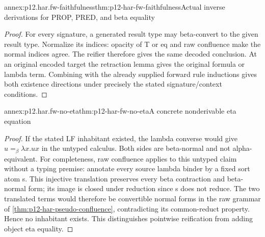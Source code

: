 \begin{annexitem}{annex:p12.har.fw-faithfulness}{thm:p12-har-fw-faithfulness}{Actual inverse derivations for PROP, PRED, and beta equality}
\begin{proof}
For every signature, a generated result type may beta-convert to the
given result type. Normalize its indices: opacity of T or eq and raw
confluence make the normal indices agree. The reifier therefore gives
the same decoded conclusion. At an original encoded target the
retraction lemma gives the original formula or lambda term. Combining
with the already supplied forward rule inductions gives both existence
directions under precisely the stated signature/context conditions.
\end{proof}
\end{annexitem}

\begin{annexitem}{annex:p12.har.fw-no-eta}{thm:p12-har-fw-no-eta}{A concrete nonderivable eta equation}
\begin{proof}
If the stated LF inhabitant existed, the lambda converse would give
\(u=_\beta\lambda x.ux\) in the untyped calculus. Both sides
are beta-normal and not alpha-equivalent. For completeness, raw
confluence applies to this untyped claim without a typing premise:
annotate every source lambda binder by a fixed sort atom s. This
injective translation preserves every beta contraction and beta-normal
form; its image is closed under reduction since s does not reduce.
The two translated terms would therefore be convertible normal forms
in the raw grammar of \cref{thm:p12-har-pseudo-confluence}, contradicting
its common-reduct property. Hence no inhabitant exists. This distinguishes
pointwise reification from adding object eta equality.
\end{proof}
\end{annexitem}

